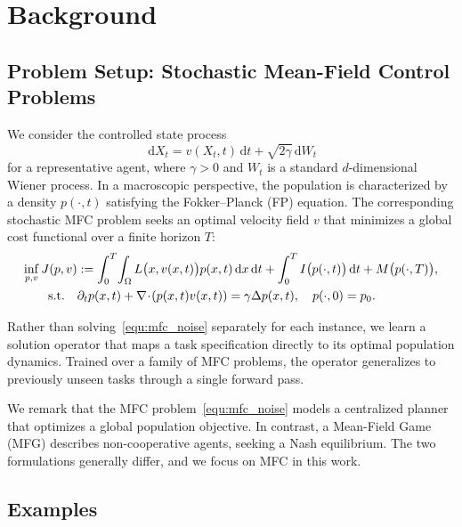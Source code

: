 \documentclass[preprint]{elsarticle}
\newcommand{\dd}{\,\mathrm{d}}          \newcommand{\pdv}[2]{\dfrac{\partial #1}{\partial #2}}
\newcommand{\g}{\gamma}
\newcommand{\Om}{\Omega}
\begin{document}
\section{Background}\label{sec:background}
\subsection{Problem Setup: Stochastic Mean-Field Control Problems}\label{sec:mfc}

We consider the controlled state process
\begin{equation}
\dd X_t = v(X_t,t)\dd t + \sqrt{2\g} \dd W_t \label{equ:sde}
\end{equation}
for a representative agent, where $\g>0$ and $W_t$ is a standard $d$-dimensional Wiener process. In a macroscopic perspective, the population is characterized by a density $p(\cdot,t)$ satisfying the Fokker--Planck (FP) equation. The corresponding stochastic MFC problem seeks an optimal velocity field $v$ that minimizes a global cost functional over a finite horizon $T$:
\begin{align}
    \inf_{p,v} J(p,v)
    &:= \int_0^T\!\int_\Om L\qb{x,v(x,t)}p(x,t) \dd x\dd t
    + \int_0^T I\qb{p(\cdot,t)}\dd t
    + M\qb{p(\cdot,T)}, \label{equ:mfc_noise} \\
    \text{s.t.}\quad&
    \partial_t p(x,t) + \nabla\!\cdot\!(p(x,t)v(x,t)) = \g\Delta p(x,t),\quad
    p(\cdot,0) = p_0. \label{equ:fp}
\end{align}

Rather than solving~\eqref{equ:mfc_noise} separately for each instance, we learn a solution operator that maps a task specification directly to its optimal population dynamics. Trained over a family of MFC problems, the operator generalizes to previously unseen tasks through a single forward pass.

We remark that the MFC problem~\eqref{equ:mfc_noise} models a centralized planner that optimizes a global population objective. In contrast, a Mean-Field Game (MFG) describes non-cooperative agents, seeking a Nash equilibrium. The two formulations generally differ, and we focus on MFC in this work.

\subsection{Examples}\label{sec:examples}
\end{document}
